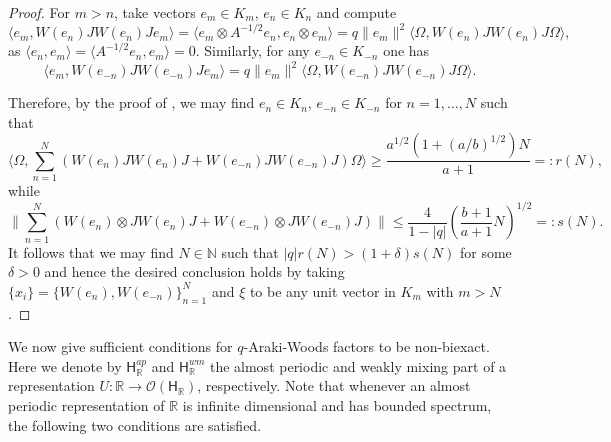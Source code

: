 \documentclass[a4paper,11pt]{amsart}
\theoremstyle{definition}
\newcommand{\N}{{\mathbb N}}
\newcommand{\R}{{\mathbb R}}
\newcommand{\cO}{{\mathcal O}}
\newcommand{\sH}{\mathsf{H}}
\newcommand{\ot}{\otimes}
\begin{document}
\begin{proof}
For $m>n$, take vectors $e_m\in K_m$, $e_n\in K_n$ and compute
$$
\langle e_m, W(e_n) JW(e_n)J e_m\rangle=\langle e_m\ot A^{-1/2} e_n, e_n\ot e_m\rangle=q\|e_m\|^2\langle \Omega, W(e_n) JW(e_n) J\Omega\rangle,
$$
as $\langle e_n, e_m\rangle=\langle A^{-1/2} e_n, e_m\rangle=0$.
Similarly, for any $e_{-n}\in K_{-n}$ one has
$$\langle e_m, W(e_{-n}) JW(e_{-n})J e_m\rangle=q\|e_m\|^2\langle \Omega, W(e_{-n})JW(e_{-n})J\Omega\rangle.$$

Therefore, by the proof of \cite[Theorem 2.3]{Hia03}, we may find $e_n\in K_n$, $e_{-n}\in K_{-n}$
	for $n=1,\dots, N$ such that
$$
\langle\Omega, \sum_{n=1}^N (W(e_n) JW(e_n)J+W(e_{-n})JW(e_{-n})J)\Omega\rangle\geq \frac{a^{1/2}(1+(a/b)^{1/2})N}{a+1}=: r(N),
$$
while
$$
\|\sum_{n=1}^N( W(e_n) \ot JW(e_n)J+ W(e_{-n})\ot JW(e_{-n})J)\|\leq \frac{4}{1-|q|}(\frac{b+1}{a+1} N)^{1/2}=: s(N).
$$
It follows that we may find $N\in \N$ such that $|q| r(N)>(1+\delta)s(N)$ for some $\delta>0$
	and hence the desired conclusion holds by taking $\{x_i\}=\{W(e_n), W(e_{-n})\}_{n=1}^N$
		and $\xi$ to be any unit vector in $K_m$ with $m>N$.
\end{proof}

We now give sufficient conditions for $q$-Araki-Woods factors to be non-biexact.
Here we denote by $\sH_\R^{ap}$ and $\sH_\R^{wm}$ the almost periodic and weakly mixing part of a representation $U: \R\to \cO(\sH_\R)$,
	respectively. 
Note that whenever an almost periodic representation of $\R$ is infinite dimensional and has bounded spectrum, 
	the following two conditions are satisfied.
\end{document}
